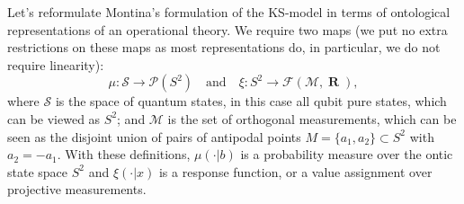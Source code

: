 \documentclass[12pt,draft]{article}
\DeclareMathOperator{\R}{\mathbf{R}}
\theoremstyle{definition}
\theoremstyle{plain}
\begin{document}
    {
        \color{red} Let's reformulate Montina's formulation
        of the KS-model in terms of ontological
        representations of an operational theory. We require
        two maps (we put no extra restrictions on these maps
        as most representations do, in particular, we do not
        require linearity):
        \begin{equation}
            \mu
            : \mathcal{S} \to \mathcal{P}(S^2)
            \quad\text{and}\quad
            \xi
            : S^2 \to \mathcal{F}(\mathcal{M}, \R),
        \end{equation}
        where $\mathcal{S}$ is the space of quantum states,
        in this case all qubit pure states, which can be
        viewed as $S^2$; and $\mathcal{M}$ is the set of
        orthogonal measurements, which can be seen as the
        disjoint union of pairs of antipodal points $M =
        \{a_1, a_2\} \subset S^2$ with $a_2 = -a_1$. With
        these definitions, $\mu(\cdot | b)$ is a probability
        measure over the ontic state space $S^2$ and
        $\xi(\cdot | x)$ is a response function, or a value
        assignment over projective measurements.

}
\end{document}
